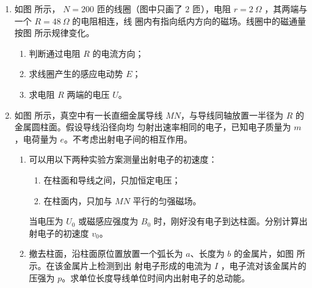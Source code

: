 \begin{enumerate}
\item
如图  所示， $ N =200 $ 匝的线圈（图中只画了 $ 2 $ 匝），电阻 $ r=2 \ \Omega $ ，其两端与一个 $ R = 48 \ \Omega $ 的电阻相连，线
圈内有指向纸内方向的磁场。线圈中的磁通量按图  所示规律变化。
\begin{enumerate}
\item
判断通过电阻 $ R $ 的电流方向；
\item 
求线圈产生的感应电动势 $ E $；
\item 
求电阻 $ R $ 两端的电压 $ U $。
\end{enumerate}
\begin{figure}[h!]
\flushright
\begin{subfigure}{0.3\linewidth}
\centering
 
\caption{}\label{2020:北京18:a}
\end{subfigure}
\begin{subfigure}{0.3\linewidth}
\centering
 
\caption{}\label{2020:北京18:b}
\end{subfigure}
\end{figure}






\newpage
\item 
如图  所示，真空中有一长直细金属导线 $ MN $，与导线同轴放置一半径为 $ R $ 的金属圆柱面。假设导线沿径向均
匀射出速率相同的电子，已知电子质量为 $ m $，电荷量为 $ e $。不考虑出射电子间的相互作用。
\begin{enumerate}
\item
可以用以下两种实验方案测量出射电子的初速度：
\begin{enumerate}
\item
在柱面和导线之间，只加恒定电压；

\item 
在柱面内，只加与 $ MN $ 平行的匀强磁场。
\end{enumerate}


当电压为 $ U_{0} $ 或磁感应强度为 $ B_{0} $ 时，刚好没有电子到达柱面。分别计算出射电子的初速度 $ v_{0} $。

\item 
撤去柱面，沿柱面原位置放置一个弧长为 $ a $、长度为 $ b $ 的金属片，如图  所示。在该金属片上检测到出
射电子形成的电流为 $ I $ ，电子流对该金属片的压强为 $ p $。求单位长度导线单位时间内出射电子的总动能。


\end{enumerate}
\end{enumerate}

